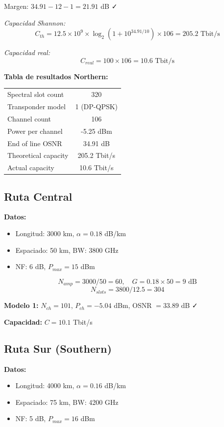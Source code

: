 \documentclass[a4paper,11pt]{article}
\begin{document}
Margen: $34.91 - 12 - 1 = 21.91$ dB ✓

\textit{Capacidad Shannon:}
$$C_{th} = 12.5 \times 10^9 \times \log_2(1 + 10^{34.91/10}) \times 106 = 205.2 \text{ Tbit/s}$$

\textit{Capacidad real:}
$$C_{real} = 100 \times 106 = 10.6 \text{ Tbit/s}$$

\textbf{Tabla de resultados Northern:}
\begin{center}
\begin{tabular}{|l|c|}
\hline
Spectral slot count & 320 \\
Transponder model & 1 (DP-QPSK) \\
Channel count & 106 \\
Power per channel & -5.25 dBm \\
End of line OSNR & 34.91 dB \\
Theoretical capacity & 205.2 Tbit/s \\
Actual capacity & 10.6 Tbit/s \\
\hline
\end{tabular}
\end{center}

\subsection*{Ruta Central}
\textbf{Datos:}
\begin{itemize}
    \item Longitud: 3000 km, $\alpha = 0.18$ dB/km
    \item Espaciado: 50 km, BW: 3800 GHz
    \item NF: 6 dB, $P_{max} = 15$ dBm
\end{itemize}

$$N_{amp} = 3000/50 = 60, \quad G = 0.18 \times 50 = 9 \text{ dB}$$
$$N_{slots} = 3800/12.5 = 304$$

\textbf{Modelo 1:} $N_{ch} = 101$, $P_{ch} = -5.04$ dBm, OSNR $= 33.89$ dB ✓

\textbf{Capacidad:} $C = 10.1$ Tbit/s

\subsection*{Ruta Sur (Southern)}
\textbf{Datos:}
\begin{itemize}
    \item Longitud: 4000 km, $\alpha = 0.16$ dB/km
    \item Espaciado: 75 km, BW: 4200 GHz
    \item NF: 5 dB, $P_{max} = 16$ dBm
\end{itemize}
\end{document}
